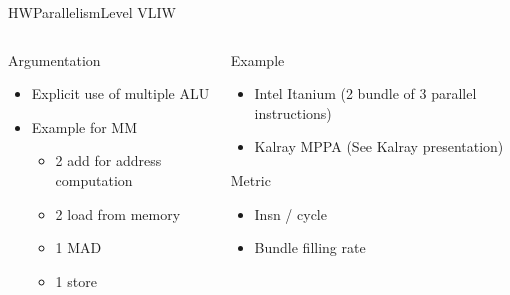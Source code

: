 %
\begin{Frame}{HWParallelismLevel VLIW}
  \begin{columns}[t]
    \begin{column}{5cm} %
      \begin{block}{Argumentation}
        \begin{itemize}
        \item Explicit use of multiple ALU
        \item Example for MM
          \begin{itemize}
          \item 2 add for address computation
          \item 2 load from memory
          \item 1 MAD
          \item 1 store
          \end{itemize}
        \end{itemize}
      \end{block} 
    \end{column}
    
    \begin{column}{5cm} %
      \begin{block}{Example}
        \begin{itemize}
        \item Intel Itanium (2 bundle of 3 parallel instructions)
        \item Kalray MPPA (See Kalray presentation)
        \end{itemize}
      \end{block}   
      \begin{alertblock}{Metric}
        \begin{itemize}
        \item Insn / cycle
        \item Bundle filling rate
        \end{itemize}
      \end{alertblock}   
    \end{column}
  \end{columns}  
\end{Frame}


